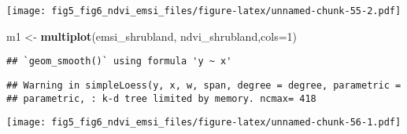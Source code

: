 \documentclass[
]{article}
\newenvironment{Shaded}{\begin{snugshade}}{\end{snugshade}}
\newcommand{\DataTypeTok}[1]{\textcolor[rgb]{0.13,0.29,0.53}{#1}}
\newcommand{\DecValTok}[1]{\textcolor[rgb]{0.00,0.00,0.81}{#1}}
\newcommand{\KeywordTok}[1]{\textcolor[rgb]{0.13,0.29,0.53}{\textbf{#1}}}
\newcommand{\NormalTok}[1]{#1}
\newcommand{\StringTok}[1]{\textcolor[rgb]{0.31,0.60,0.02}{#1}}
\begin{document}
\texttt{[image: fig5\_fig6\_ndvi\_emsi\_files/figure-latex/unnamed-chunk-55-2.pdf]}

\begin{Shaded}
\begin{Highlighting}[]
\NormalTok{m1 <-}\StringTok{ }\KeywordTok{multiplot}\NormalTok{(emsi_shrubland, ndvi_shrubland,}\DataTypeTok{cols=}\DecValTok{1}\NormalTok{)}
\end{Highlighting}
\end{Shaded}

\begin{verbatim}
## `geom_smooth()` using formula 'y ~ x'
\end{verbatim}

\begin{verbatim}
## Warning in simpleLoess(y, x, w, span, degree = degree, parametric =
## parametric, : k-d tree limited by memory. ncmax= 418
\end{verbatim}

\texttt{[image: fig5\_fig6\_ndvi\_emsi\_files/figure-latex/unnamed-chunk-56-1.pdf]}
\end{document}
